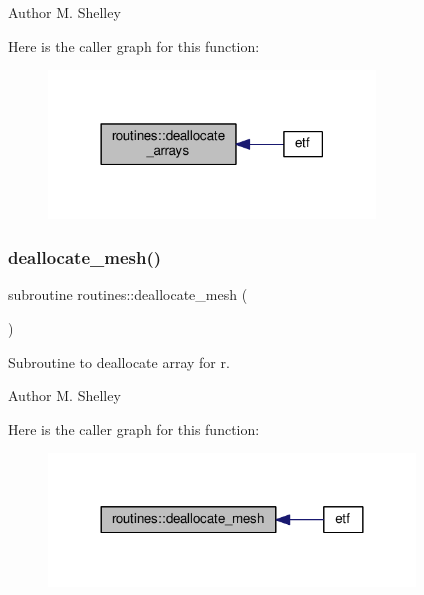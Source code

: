 \begin{DoxyAuthor}{Author}
M. Shelley 
\end{DoxyAuthor}
Here is the caller graph for this function\+:
\nopagebreak
\begin{figure}[H]
\begin{center}
\leavevmode
\includegraphics[width=246pt]{namespaceroutines_ae7bc716d30ef4d9ecece5daa22324b77_icgraph}
\end{center}
\end{figure}
\mbox{\label{namespaceroutines_a27ad9ac802069004010c9759fecced92}} 
\subsubsection{\texorpdfstring{deallocate\+\_\+mesh()}{deallocate\_mesh()}}
{\footnotesize\ttfamily subroutine routines\+::deallocate\+\_\+mesh (\begin{DoxyParamCaption}{ }\end{DoxyParamCaption})}



Subroutine to deallocate array for r. 

\begin{DoxyAuthor}{Author}
M. Shelley 
\end{DoxyAuthor}
Here is the caller graph for this function\+:
\nopagebreak
\begin{figure}[H]
\begin{center}
\leavevmode
\includegraphics[width=276pt]{namespaceroutines_a27ad9ac802069004010c9759fecced92_icgraph}
\end{center}
\end{figure}
\mbox{\label{namespaceroutines_a74ed186c93b400a14428192e1cb7a0b2}} 
